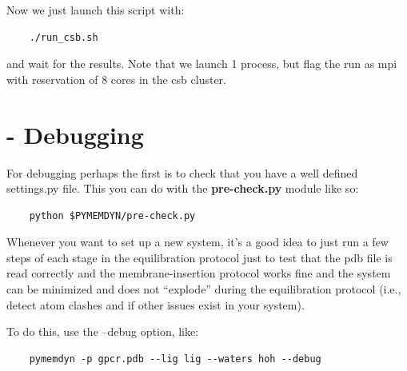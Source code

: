 \documentclass[10pt, oneside, pdftex]{article}
\begin{document}
Now  we  just launch this script with: 
\begin{Verbatim}
    ./run_csb.sh
\end{Verbatim}
and wait  for the results. Note that  we launch 1 process,
but flag the run as mpi with reservation of 8 cores in the csb cluster.

\section*{ - Debugging} 
For debugging perhaps the first is to check that you have a well
defined settings.py file. This you can do with the
\textbf{pre-check.py} module like so:

\begin{Verbatim}
    python $PYMEMDYN/pre-check.py
\end{Verbatim}

\noindent Whenever you want  to set up a new system,  it's a good idea
to just  run a few steps  of each stage in  the equilibration protocol
just  to   test  that  the  pdb   file  is  read  correctly   and  the
membrane-insertion protocol works fine and the system can be minimized
and  does not  ``explode''  during the  equilibration protocol  (i.e.,
detect atom clashes and if other issues exist in your system).

To do this, use the --debug option, like:
\begin{Verbatim}
    pymemdyn -p gpcr.pdb --lig lig --waters hoh --debug
\end{Verbatim}
\end{document}
